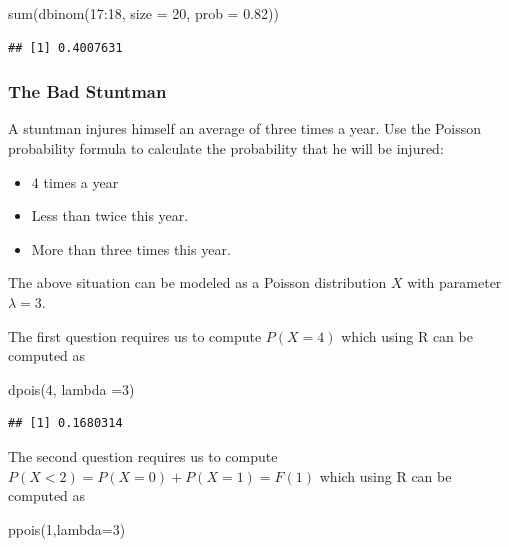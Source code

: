 \documentclass[
]{book}
\newenvironment{Shaded}{\begin{snugshade}}{\end{snugshade}}
\newcommand{\AttributeTok}[1]{\textcolor[rgb]{0.77,0.63,0.00}{#1}}
\newcommand{\DecValTok}[1]{\textcolor[rgb]{0.00,0.00,0.81}{#1}}
\newcommand{\FloatTok}[1]{\textcolor[rgb]{0.00,0.00,0.81}{#1}}
\newcommand{\FunctionTok}[1]{\textcolor[rgb]{0.00,0.00,0.00}{#1}}
\newcommand{\NormalTok}[1]{#1}
\newcommand{\SpecialCharTok}[1]{\textcolor[rgb]{0.00,0.00,0.00}{#1}}
\theoremstyle{definition}
\theoremstyle{definition}
\theoremstyle{definition}
\theoremstyle{definition}
\theoremstyle{remark}
\begin{document}
\begin{Shaded}
\begin{Highlighting}[]
\FunctionTok{sum}\NormalTok{(}\FunctionTok{dbinom}\NormalTok{(}\DecValTok{17}\SpecialCharTok{:}\DecValTok{18}\NormalTok{, }\AttributeTok{size =} \DecValTok{20}\NormalTok{, }\AttributeTok{prob =} \FloatTok{0.82}\NormalTok{))}
\end{Highlighting}
\end{Shaded}

\begin{verbatim}
## [1] 0.4007631
\end{verbatim}

\hypertarget{the-bad-stuntman}{%
\subsubsection{The Bad Stuntman}\label{the-bad-stuntman}}

A stuntman injures himself an average of three times a year. Use the Poisson probability formula to calculate the probability that he will be injured:

\begin{itemize}
\item
  4 times a year
\item
  Less than twice this year.
\item
  More than three times this year.
\end{itemize}

The above situation can be modeled as a Poisson distribution \(X\) with parameter \(\lambda = 3\).

The first question requires us to compute \(P(X=4)\) which using R can be computed as

\begin{Shaded}
\begin{Highlighting}[]
\FunctionTok{dpois}\NormalTok{(}\DecValTok{4}\NormalTok{, }\AttributeTok{lambda =}\DecValTok{3}\NormalTok{)}
\end{Highlighting}
\end{Shaded}

\begin{verbatim}
## [1] 0.1680314
\end{verbatim}

The second question requires us to compute \(P(X<2) = P(X=0)+P(X=1)= F(1)\) which using R can be computed as

\begin{Shaded}
\begin{Highlighting}[]
\FunctionTok{ppois}\NormalTok{(}\DecValTok{1}\NormalTok{,}\AttributeTok{lambda=}\DecValTok{3}\NormalTok{)}
\end{Highlighting}
\end{Shaded}
\end{document}
